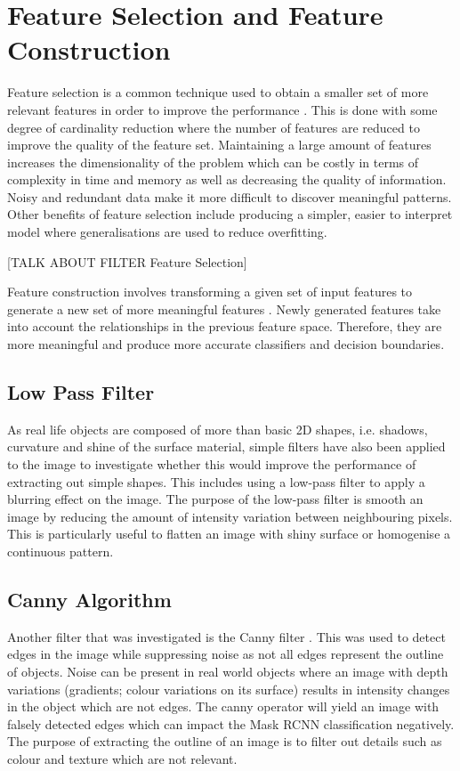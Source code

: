 \section{Feature Selection and Feature Construction}\label{subsubsec:fsfc}

Feature selection is a common technique used to obtain a smaller set of more relevant features in order to improve the performance \cite{yu2004efficient}. This is done with some degree of cardinality reduction where the number of features are reduced to improve the quality of the feature set. Maintaining a large amount of features increases the dimensionality of the problem which can be costly in terms of complexity in time and memory as well as decreasing the quality of information. Noisy and redundant data make it more difficult to discover meaningful patterns. Other benefits of feature selection include producing a simpler, easier to interpret model where generalisations are used to reduce overfitting.

[TALK ABOUT FILTER Feature Selection]

Feature construction involves transforming a given set of input features to generate a new set of more meaningful features \cite{markovitch2002feature}. Newly generated features take into account the relationships in the previous feature space. Therefore, they are more meaningful and produce more accurate classifiers and decision boundaries. 

\subsection{Low Pass Filter}
As real life objects are composed of more than basic 2D shapes, i.e. shadows, curvature and shine of the surface material, simple filters have also been applied to the image to investigate whether this would improve the performance of extracting out simple shapes. This includes using a low-pass filter to apply a blurring effect on the image. The purpose of the low-pass filter is smooth an image by reducing the amount of intensity variation between neighbouring pixels. This is particularly useful to flatten an image with shiny surface or homogenise a continuous pattern.

\subsection{Canny Algorithm}

Another filter that was investigated is the Canny filter \cite{canny1986computational}. This was used to detect edges in the image while suppressing noise as not all edges represent the outline of objects. Noise can be present in real world objects where an image with depth variations (gradients; colour variations on its surface) results in intensity changes in the object which are not edges. The canny operator will yield an image with falsely detected edges which can impact the Mask RCNN classification negatively. The purpose of extracting the outline of an image is to filter out details such as colour and texture which are not relevant.


